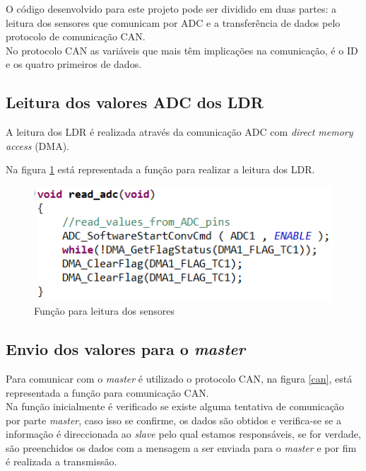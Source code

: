 O código desenvolvido para este projeto pode ser dividido em duas partes: a leitura dos sensores que comunicam por ADC e a transferência de dados pelo protocolo de comunicação CAN.
\\No protocolo CAN as variáveis que mais têm implicações na comunicação, é o ID e os quatro primeiros  de dados.

\subsection{Leitura dos valores ADC dos LDR}

A leitura dos LDR é realizada através da comunicação ADC com
\textit{direct memory access} (DMA).

Na figura \ref{adc} está representada a função para realizar a leitura dos LDR.

\begin{figure}[!htb]
\centering
\includegraphics[scale=1]{Figuras/adc.PNG}
\caption{Função para leitura dos sensores}
\label{adc}
\end{figure}

\newpage

\subsection{Envio dos valores para o \textit{master}}

Para comunicar com o \textit{master} é utilizado o protocolo CAN, na figura \ref{can}, está representada a função para comunicação CAN.
\\Na função inicialmente é verificado se existe alguma tentativa de comunicação por parte \textit{master}, caso isso se confirme, os dados são obtidos e verifica-se se a informação é direccionada ao \textit{slave} pelo qual estamos responsáveis, se for verdade, são preenchidos os dados com a mensagem a ser enviada para o \textit{master} e por fim é realizada a transmissão.   

